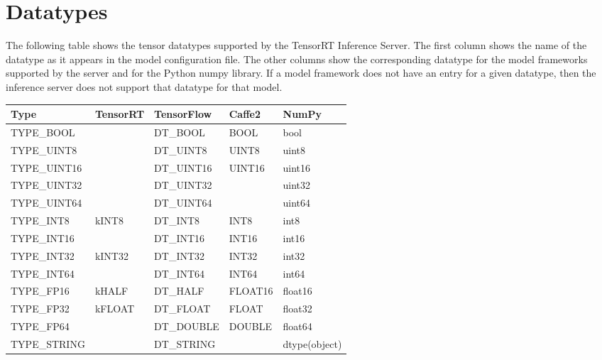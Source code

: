 \documentclass[letterpaper,10pt,english]{sphinxmanual}
\begin{document}
\section{Datatypes}
\label{\detokenize{model_configuration:datatypes}}\label{\detokenize{model_configuration:section-datatypes}}
The following table shows the tensor datatypes supported by the
TensorRT Inference Server. The first column shows the name of the
datatype as it appears in the model configuration file. The other
columns show the corresponding datatype for the model frameworks
supported by the server and for the Python numpy library. If a model
framework does not have an entry for a given datatype, then the
inference server does not support that datatype for that model.


\begin{savenotes}\sphinxattablestart
\centering
\begin{tabulary}{\linewidth}[t]{|T|T|T|T|T|}
\hline
\sphinxstyletheadfamily 
Type
&\sphinxstyletheadfamily 
TensorRT
&\sphinxstyletheadfamily 
TensorFlow
&\sphinxstyletheadfamily 
Caffe2
&\sphinxstyletheadfamily 
NumPy
\\
\hline
TYPE\_BOOL
&&
DT\_BOOL
&
BOOL
&
bool
\\
\hline
TYPE\_UINT8
&&
DT\_UINT8
&
UINT8
&
uint8
\\
\hline
TYPE\_UINT16
&&
DT\_UINT16
&
UINT16
&
uint16
\\
\hline
TYPE\_UINT32
&&
DT\_UINT32
&&
uint32
\\
\hline
TYPE\_UINT64
&&
DT\_UINT64
&&
uint64
\\
\hline
TYPE\_INT8
&
kINT8
&
DT\_INT8
&
INT8
&
int8
\\
\hline
TYPE\_INT16
&&
DT\_INT16
&
INT16
&
int16
\\
\hline
TYPE\_INT32
&
kINT32
&
DT\_INT32
&
INT32
&
int32
\\
\hline
TYPE\_INT64
&&
DT\_INT64
&
INT64
&
int64
\\
\hline
TYPE\_FP16
&
kHALF
&
DT\_HALF
&
FLOAT16
&
float16
\\
\hline
TYPE\_FP32
&
kFLOAT
&
DT\_FLOAT
&
FLOAT
&
float32
\\
\hline
TYPE\_FP64
&&
DT\_DOUBLE
&
DOUBLE
&
float64
\\
\hline
TYPE\_STRING
&&
DT\_STRING
&&
dtype(object)
\\
\hline
\end{tabulary}
\par
\sphinxattableend\end{savenotes}
\end{document}
